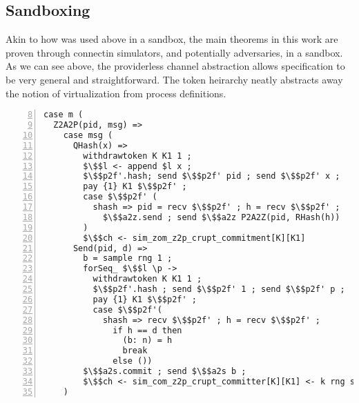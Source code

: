 \subsection{Sandboxing}
Akin to how \Fro was used above in a sandbox, the main theorems in this work are proven through connectin simulators, and potentially adversaries, in a sandbox. 
As we can see above, the providerless channel abstraction allows specification to be very general and straightforward. 
The token heirarchy neatly abstracts away the notion of virtualization from process definitions. 


\begin{lstlisting}[basicstyle=\footnotesize\BeraMonottFamily, mathescape, frame=single, numbers=left, xleftmargin=2em, xrightmargin=2em, firstnumber=8]
case m (
  Z2A2P(pid, msg) =>
    case msg (
      QHash(x) => 
        withdrawtoken K K1 1 ;
        $\$$l <- append $l x ;
        $\$$p2f'.hash; send $\$$p2f' pid ; send $\$$p2f' x ;
        pay {1} K1 $\$$p2f' ;
        case $\$$p2f' (
          shash => pid = recv $\$$p2f' ; h = recv $\$$p2f' ;
            $\$$a2z.send ; send $\$$a2z P2A2Z(pid, RHash(h))
        )
        $\$$ch <- sim_zom_z2p_crupt_commitment[K][K1]
      Send(pid, d) =>
        b = sample rng 1 ;
        forSeq_ $\$$l \p ->
          withdrawtoken K K1 1 ;
          $\$$p2f'.hash ; send $\$$p2f' 1 ; send $\$$p2f' p ;
          pay {1} K1 $\$$p2f' ;
          case $\$$p2f'( 
            shash => recv $\$$p2f' ; h = recv $\$$p2f' ;
              if h == d then
                (b: n) = h 
                break
              else ())
        $\$$a2s.commit ; send $\$$a2s b ;
        $\$$ch <- sim_com_z2p_crupt_committer[K][K1] <- k rng sid $\$$z2a $\$$a2z $\$$a2s $\$$a2r $\$$p2f' $\$$f2p' $\$$l
    )
\end{lstlisting}






